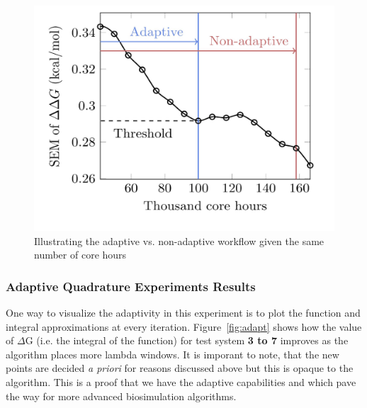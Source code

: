 \begin{figure}
  \centering
    \includegraphics[width=\columnwidth]{figures/adaptive_vs_nonadaptive_pseudo.pdf}
    \caption{Illustrating the adaptive vs. non-adaptive workflow given the
    same number of core hours}
\label{fig:adaptive_vs_nonadaptive_TIES}
\end{figure}

\subsubsection{Adaptive Quadrature Experiments Results}


One way to visualize the adaptivity in this experiment is to plot the
function and integral approximations at every iteration.
Figure~\ref{fig:adapt} shows how the value of $\Delta$G (i.e. the integral of
the function) for test system \textbf{3 to 7} improves as the algorithm
places more lambda windows. It is imporant to note, that the new points are
decided {\it a priori} for reasons discussed above but this is opaque to the
algorithm. This is a proof that we have the adaptive capabilities and which
pave the way for more advanced biosimulation algorithms.


